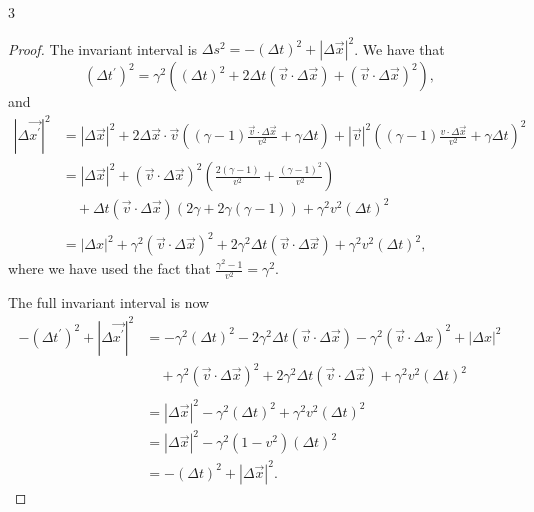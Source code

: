 \documentclass[11pt]{article}
\begin{document}
\begin{problem}{3}
\begin{enumerate}[label=(\alph*)]
\begin{proof}
            The invariant interval is \( \Delta s^2 = -(\Delta t)^2 + | \Delta \vec{x} |^2 \).
            We have that
            \begin{equation}
            \label{eq:55}
            (\Delta t^{\prime})^2 = \gamma^2 \left( (\Delta t)^2 + 2 \Delta t(\vec{v} \cdot \Delta \vec{x}) + (\vec{v} \cdot \Delta \vec{x})^2 \right),
            \end{equation}
            and
            \begin{equation}
            \begin{aligned}
            \label{eq:56}
            | \Delta \vec{x^{\prime}} | ^2 &= | \Delta \vec{x} | ^2 + 2\Delta \vec{x} \cdot \vec{v} \left( (\gamma-1) \frac{\vec{v} \cdot \Delta \vec{x}}{v^2} + \gamma \Delta t \right) + | \vec{v} |^2 \left( (\gamma-1) \frac{v \cdot \Delta \vec{x}}{v^2} + \gamma \Delta t \right)^2 \\
                                           &= |\Delta \vec{x} |^2 + (\vec{v} \cdot \Delta \vec{x})^2 \left( \frac{2(\gamma - 1)}{v^2} + \frac{(\gamma-1)^2}{v^2} \right) \\ &\quad + \Delta t(\vec{v} \cdot \Delta \vec{x}) \left( 2\gamma + 2\gamma(\gamma-1) \right) + \gamma^2 v^2 (\Delta t)^2 \\\\
              &= | \Delta x |^2 + \gamma^2(\vec{v} \cdot \Delta \vec{x})^2 + 2 \gamma^2 \Delta t(\vec{v} \cdot \Delta \vec{x}) + \gamma^2v^2(\Delta t)^2,
            \end{aligned}
            \end{equation}
            where we have used the fact that \( \frac{\gamma^2 -1}{v^2} = \gamma^2 \).

            The full invariant interval is now
            \begin{equation}
            \begin{aligned}
            \label{eq:57}
              -(\Delta t^{\prime})^2 + |\Delta \vec{x^{\prime}} |^2 &= -\gamma^2(\Delta t)^2 - 2\gamma^2 \Delta t (\vec{v} \cdot \Delta \vec{x}) - \gamma^2( \vec{v} \cdot \Delta x )^2 + |\Delta x |^2 \\ & \quad + \gamma^2 (\vec{v} \cdot \Delta \vec{x})^2 + 2 \gamma^2 \Delta t (\vec{v} \cdot \Delta \vec{x}) + \gamma^2 v^2 (\Delta t)^2 \\\\
              &= | \Delta \vec{x} |^2 - \gamma^2 (\Delta t)^2 + \gamma^2 v^2 (\Delta t)^2 \\
              &= |\Delta \vec{x} |^2 - \gamma^2 (1-v^2)(\Delta t)^2 \\
              &= -(\Delta t)^2 + | \Delta \vec{x} |^2.
            \end{aligned}
            \end{equation}
          \end{proof}
	\end{enumerate}
\end{problem}
\end{document}
